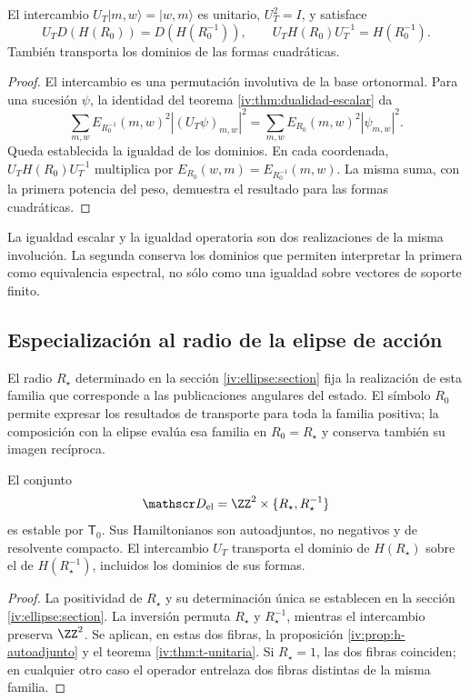 \begin{theorem}
\label{iv:thm:t-unitaria}
\label{prop:dualidad-radios-k}
El intercambio
\(U_T|m,w\rangle=|w,m\rangle\) es unitario,
\(U_T^2=I\), y satisface
\begin{equation}
 U_TD(H(R_0))=D(H(R_0^{-1})),
 \qquad U_TH(R_0)U_T^{-1}=H(R_0^{-1}).
 \label{iv:eq:conjugacion-h}
\end{equation}
También transporta los dominios de las formas cuadráticas.
\end{theorem}
\begin{proof}
El intercambio es una permutación involutiva de la base
ortonormal. Para una sucesión \(\psi\), la identidad del
teorema \ref{iv:thm:dualidad-escalar} da
\[
 \sum_{m,w}E_{R_0^{-1}}(m,w)^2|(U_T\psi)_{m,w}|^2
 =\sum_{m,w}E_{R_0}(m,w)^2|\psi_{m,w}|^2.
\]
Queda establecida la igualdad de los dominios. En cada coordenada,
\(U_TH(R_0)U_T^{-1}\) multiplica por
\(E_{R_0}(w,m)=E_{R_0^{-1}}(m,w)\). La misma suma, con
la primera potencia del peso, demuestra el resultado para las
formas cuadráticas.
\end{proof}

La igualdad escalar y la igualdad operatoria son dos realizaciones
de la misma involución. La segunda conserva los dominios que
permiten interpretar la primera como equivalencia espectral,
no sólo como una igualdad sobre vectores de soporte finito.

\subsection{Especialización al radio de la elipse de acción}

El radio \(R_\star\) determinado en la sección
\ref{iv:ellipse:section} fija la realización de esta familia que
corresponde a las publicaciones angulares del estado. El símbolo
\(R_0\) permite expresar los resultados de transporte para toda la
familia positiva; la composición con la elipse evalúa esa familia en
\(R_0=R_\star\) y conserva también su imagen recíproca.

\begin{corollary}
\label{iv:cor:radio-especializado}
El conjunto
\[
 \mathscr D_{\mathrm{el}}
 =\ZZ^2\times\{R_\star,R_\star^{-1}\}
\]
es estable por \(\mathsf T_0\). Sus Hamiltonianos son autoadjuntos,
no negativos y de resolvente compacto. El intercambio \(U_T\)
transporta el dominio de \(H(R_\star)\) sobre el de
\(H(R_\star^{-1})\), incluidos los dominios de sus formas.
\end{corollary}
\begin{proof}
La positividad de \(R_\star\) y su determinación única se establecen
en la sección \ref{iv:ellipse:section}. La inversión permuta
\(R_\star\) y \(R_\star^{-1}\), mientras el intercambio preserva
\(\ZZ^2\). Se aplican, en estas dos fibras, la proposición
\ref{iv:prop:h-autoadjunto} y el teorema \ref{iv:thm:t-unitaria}.
Si \(R_\star=1\), las dos fibras coinciden; en cualquier otro caso
el operador entrelaza dos fibras distintas de la misma familia.
\end{proof}

